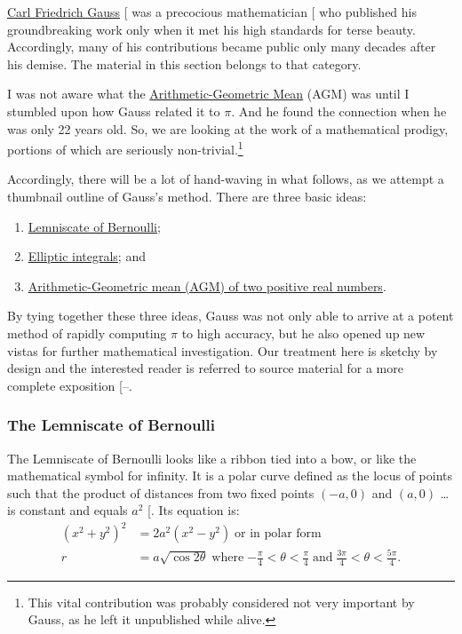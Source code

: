 \documentclass[
  a4paper,
]{article}
\begin{document}
\href{https://en.wikipedia.org/wiki/Carl_Friedrich_Gauss}{Carl Friedrich
Gauss} {[}\citeproc{ref-gauss-wiki}{30}{]} was a precocious
mathematician {[}\citeproc{ref-gauss-bio}{31}{]} who published his
groundbreaking work only when it met his high standards for terse
beauty. Accordingly, many of his contributions became public only many
decades after his demise. The material in this section belongs to that
category.

I was not aware what the
\href{https://mathworld.wolfram.com/Arithmetic-GeometricMean.html}{Arithmetic-Geometric
Mean} (AGM) was until I stumbled upon how Gauss related it to \(\pi\).
And he found the connection when he was only 22 years old. So, we are
looking at the work of a mathematical prodigy, portions of which are
seriously non-trivial.\footnote{This vital contribution was probably
  considered not very important by Gauss, as he left it unpublished
  while alive.}

Accordingly, there will be a lot of hand-waving in what follows, as we
attempt a thumbnail outline of Gauss's method. There are three basic
ideas:

\begin{enumerate}
\def\labelenumi{(\alph{enumi})}
\item
  \href{https://mathworld.wolfram.com/Lemniscate.html}{Lemniscate of
  Bernoulli};
\item
  \href{https://en.wikipedia.org/wiki/Elliptic_integral}{Elliptic
  integrals}; and
\item
  \href{https://en.wikipedia.org/wiki/Arithmetic\%E2\%80\%93geometric_mean}{Arithmetic-Geometric
  mean (AGM) of two positive real numbers}.
\end{enumerate}

By tying together these three ideas, Gauss was not only able to arrive
at a potent method of rapidly computing \(\pi\) to high accuracy, but he
also opened up new vistas for further mathematical investigation. Our
treatment here is sketchy by design and the interested reader is
referred to source material for a more complete exposition
{[}--\citeproc{ref-langton-2001}{34}{]}.

\subsubsection{The Lemniscate of
Bernoulli}\label{the-lemniscate-of-bernoulli}

The Lemniscate of Bernoulli looks like a ribbon tied into a bow, or like
the mathematical symbol for infinity. It is a polar curve defined as the
locus of points such that the product of distances from two fixed points
\((-a, 0)\) and \((a, 0)\) \ldots is constant and equals \(a^2\)
{[}\citeproc{ref-lemniscate-mathworld}{35}{]}. Its equation is: \[
\begin{aligned}
(x^2 + y^2)^2 &= 2a^2(x^2 - y^2)\; \text{or in polar form}\\
r &= a\sqrt{\cos2\theta} \; \text{where}\; \textstyle{-\frac{\pi}{4} < \theta < \frac{\pi}{4}\; \text{and}\; \frac{3\pi}{4} < \theta < \frac{5\pi}{4}}.
\end{aligned}
\]
\end{document}
